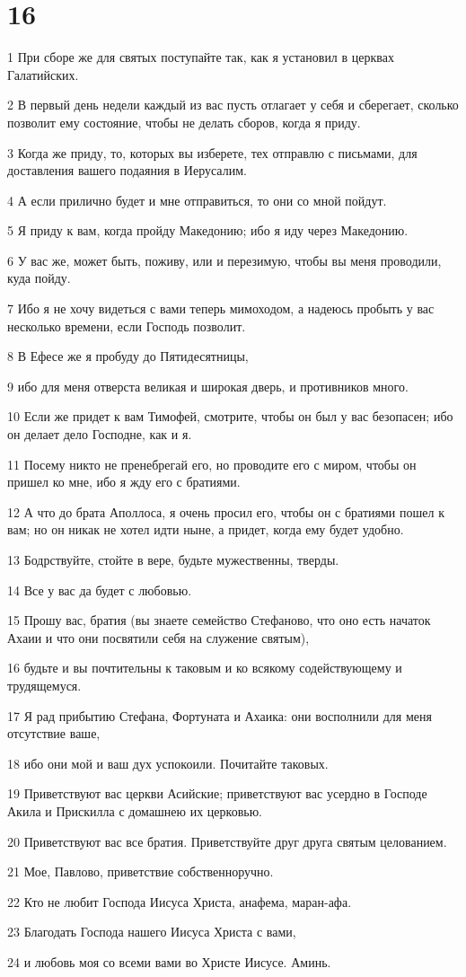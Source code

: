 \chapter{16}

\par 1 При сборе же для святых поступайте так, как я установил в церквах Галатийских.
\par 2 В первый день недели каждый из вас пусть отлагает у себя и сберегает, сколько позволит ему состояние, чтобы не делать сборов, когда я приду.
\par 3 Когда же приду, то, которых вы изберете, тех отправлю с письмами, для доставления вашего подаяния в Иерусалим.
\par 4 А если прилично будет и мне отправиться, то они со мной пойдут.
\par 5 Я приду к вам, когда пройду Македонию; ибо я иду через Македонию.
\par 6 У вас же, может быть, поживу, или и перезимую, чтобы вы меня проводили, куда пойду.
\par 7 Ибо я не хочу видеться с вами теперь мимоходом, а надеюсь пробыть у вас несколько времени, если Господь позволит.
\par 8 В Ефесе же я пробуду до Пятидесятницы,
\par 9 ибо для меня отверста великая и широкая дверь, и противников много.
\par 10 Если же придет к вам Тимофей, смотрите, чтобы он был у вас безопасен; ибо он делает дело Господне, как и я.
\par 11 Посему никто не пренебрегай его, но проводите его с миром, чтобы он пришел ко мне, ибо я жду его с братиями.
\par 12 А что до брата Аполлоса, я очень просил его, чтобы он с братиями пошел к вам; но он никак не хотел идти ныне, а придет, когда ему будет удобно.
\par 13 Бодрствуйте, стойте в вере, будьте мужественны, тверды.
\par 14 Все у вас да будет с любовью.
\par 15 Прошу вас, братия (вы знаете семейство Стефаново, что оно есть начаток Ахаии и что они посвятили себя на служение святым),
\par 16 будьте и вы почтительны к таковым и ко всякому содействующему и трудящемуся.
\par 17 Я рад прибытию Стефана, Фортуната и Ахаика: они восполнили для меня отсутствие ваше,
\par 18 ибо они мой и ваш дух успокоили. Почитайте таковых.
\par 19 Приветствуют вас церкви Асийские; приветствуют вас усердно в Господе Акила и Прискилла с домашнею их церковью.
\par 20 Приветствуют вас все братия. Приветствуйте друг друга святым целованием.
\par 21 Мое, Павлово, приветствие собственноручно.
\par 22 Кто не любит Господа Иисуса Христа, анафема, маран-афа.
\par 23 Благодать Господа нашего Иисуса Христа с вами,
\par 24 и любовь моя со всеми вами во Христе Иисусе. Аминь.



